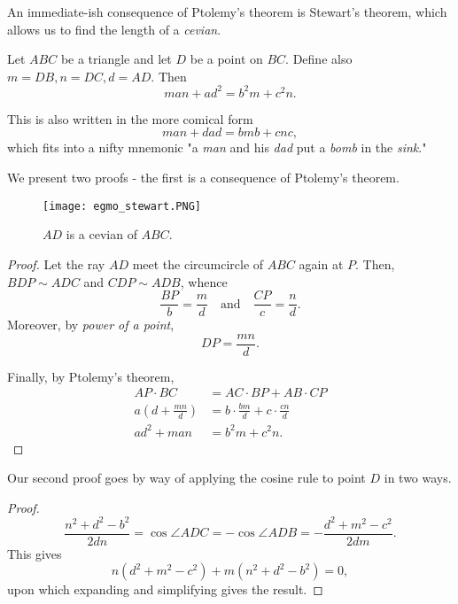 \documentclass[../jarvis.tex]{subfiles}
\begin{document}
An immediate-ish consequence of Ptolemy's theorem is Stewart's theorem, which allows us to find the length of a \textit{cevian}.

\begin{theorem}
    Let $ABC$ be a triangle and let $D$ be a point on $BC$. Define also $m=DB, n=DC, d=AD$. Then
    $$man+ad^2=b^2m+c^2n.$$
\end{theorem}
This is also written in the more comical form
$$man+dad=bmb+cnc,$$ which fits into a nifty mnemonic
"a \textit{man} and his \textit{dad} put a \textit{bomb} in the \textit{sink}."

We present two proofs - the first is a consequence of Ptolemy's theorem.

\begin{figure}[H]
    \centering
    \texttt{[image: egmo\_stewart.PNG]}
    \caption{$AD$ is a cevian of $ABC$.}
\end{figure}

\begin{proof}
    Let the ray $AD$ meet the circumcircle of $ABC$ again at $P$. Then, $BDP \sim ADC$ and $CDP\sim ADB$, whence
    $$\frac{BP}{b}=\frac{m}{d}\quad\text{and}\quad \frac{CP}{c}=\frac{n}{d}.$$
    Moreover, by \textit{power of a point},
    $$DP=\frac{mn}{d}.$$
    
    Finally, by Ptolemy's theorem,
    \begin{align*}
        AP\cdot BC&=AC\cdot BP+AB\cdot CP \\
        a\left(d+\frac{mn}{d}\right)&=b\cdot\frac{bm}{d}+c\cdot\frac{cn}{d} \\
        ad^2+man&=b^2m+c^2n.
    \end{align*}
\end{proof}

Our second proof goes by way of applying the cosine rule to point $D$ in two ways.
\begin{proof}
    $$\frac{n^2+d^2-b^2}{2dn}=\cos{\angle ADC}=-\cos{\angle ADB}=-\frac{d^2+m^2-c^2}{2dm}.$$
    This gives
    $$n(d^2+m^2-c^2)+m(n^2+d^2-b^2)=0,$$
    upon which expanding and simplifying gives the result.
\end{proof}
\end{document}
